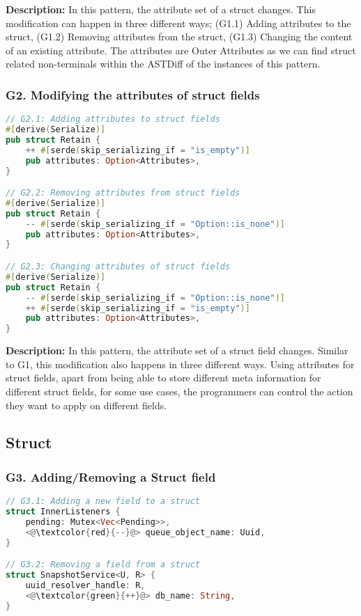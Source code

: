 \documentclass{article}
\begin{document}
\noindent \textbf{Description:} In this pattern, the attribute set of a struct changes. This modification can happen in three different ways; (G1.1) Adding attributes to the struct, (G1.2) Removing attributes from the struct, (G1.3) Changing the content of an existing attribute. The attributes are Outer Attributes as we can find struct related non-terminals within the ASTDiff of the instances of this pattern.

\subsubsection{G2. Modifying the attributes of struct fields}

\begin{lstlisting}[language=Rust, style=colouredRust, label={l3}]
// G2.1: Adding attributes to struct fields
#[derive(Serialize)]
pub struct Retain {
    ++ #[serde(skip_serializing_if = "is_empty")]
    pub attributes: Option<Attributes>,
}

// G2.2: Removing attributes from struct fields
#[derive(Serialize)]
pub struct Retain {
    -- #[serde(skip_serializing_if = "Option::is_none")]
    pub attributes: Option<Attributes>,
}

// G2.3: Changing attributes of struct fields
#[derive(Serialize)]
pub struct Retain {
    -- #[serde(skip_serializing_if = "Option::is_none")]
    ++ #[serde(skip_serializing_if = "is_empty")]
    pub attributes: Option<Attributes>,
}
\end{lstlisting}

\noindent \textbf{Description:} In this pattern, the attribute set of a struct field changes. Similar to G1, this modification also happens in three different ways. Using attributes for struct fields, apart from being able to store different meta information for different struct fields, for some use cases, the programmers can control the action they want to apply on different fields.

\subsection{Struct}
\subsubsection{G3. Adding/Removing a Struct field}

\begin{lstlisting}[language=Rust, style=colouredRust, label={l3}]
// G3.1: Adding a new field to a struct
struct InnerListeners {
    pending: Mutex<Vec<Pending>>,
    <@\textcolor{red}{--}@> queue_object_name: Uuid,
}

// G3.2: Removing a field from a struct
struct SnapshotService<U, R> {
    uuid_resolver_handle: R,
    <@\textcolor{green}{++}@> db_name: String,
}
\end{lstlisting}
\end{document}
